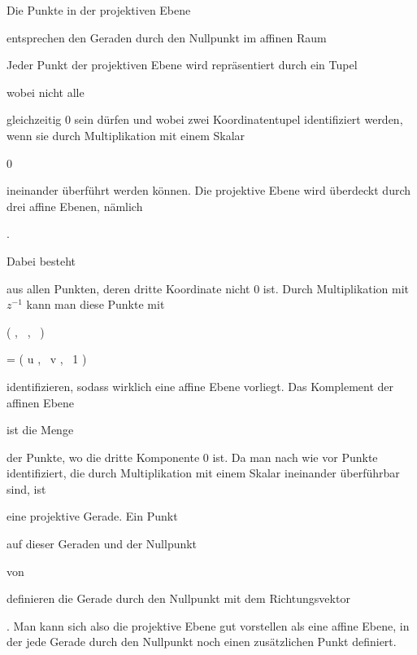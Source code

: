 {


Die Punkte in der projektiven Ebene

 entsprechen den Geraden durch den Nullpunkt im affinen Raum

 Jeder Punkt der projektiven Ebene wird repräsentiert durch ein Tupel

 wobei nicht alle

 gleichzeitig $0$ sein dürfen und wobei zwei Koordinatentupel identifiziert werden, wenn sie durch Multiplikation mit einem Skalar


\mavergleichskette

{\vergleichskette

{ \lambda
}

{ \neq }{ 0
}

{  }{
}

{    }{
}

{   }{
}

}
{}{}{}
ineinander überführt werden können. Die projektive Ebene wird überdeckt durch drei affine Ebenen, nämlich


 { . }


Dabei besteht

 aus allen Punkten, deren dritte Koordinate nicht $0$ ist. Durch Multiplikation mit $z^{-1}$ kann man diese Punkte mit


\mavergleichskettedisp

{\vergleichskette

{ \left(  {  }   , \,   {  }  , \,   {  }                 \right)
}

{ =} { \left(  u   , \,   v  , \,   1                 \right)
}

{ } {
}

{ } {
}

{ } {
}

}
{}{}{}
identifizieren, sodass wirklich eine affine Ebene vorliegt. Das Komplement der affinen Ebene

 ist die Menge

 der Punkte, wo die dritte Komponente $0$ ist. Da man nach wie vor Punkte identifiziert, die durch Multiplikation mit einem Skalar ineinander überführbar sind,  ist

 eine projektive Gerade. Ein Punkt

 auf dieser Geraden und der Nullpunkt

 von

 definieren die Gerade durch den Nullpunkt mit dem Richtungsvektor

 {} {.}
Man kann sich also die projektive Ebene gut vorstellen als eine affine Ebene, in der jede Gerade durch den Nullpunkt noch einen zusätzlichen
 {} {}
Punkt definiert.


}


